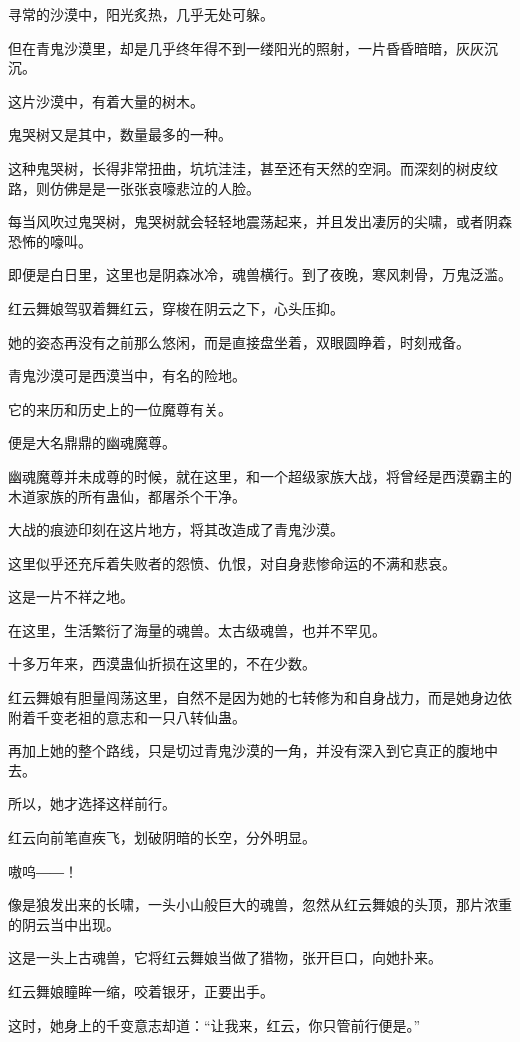 \begin{this_body}
寻常的沙漠中，阳光炙热，几乎无处可躲。

但在青鬼沙漠里，却是几乎终年得不到一缕阳光的照射，一片昏昏暗暗，灰灰沉沉。

这片沙漠中，有着大量的树木。

鬼哭树又是其中，数量最多的一种。

这种鬼哭树，长得非常扭曲，坑坑洼洼，甚至还有天然的空洞。而深刻的树皮纹路，则仿佛是是一张张哀嚎悲泣的人脸。

每当风吹过鬼哭树，鬼哭树就会轻轻地震荡起来，并且发出凄厉的尖啸，或者阴森恐怖的嚎叫。

即便是白日里，这里也是阴森冰冷，魂兽横行。到了夜晚，寒风刺骨，万鬼泛滥。

红云舞娘驾驭着舞红云，穿梭在阴云之下，心头压抑。

她的姿态再没有之前那么悠闲，而是直接盘坐着，双眼圆睁着，时刻戒备。

青鬼沙漠可是西漠当中，有名的险地。

它的来历和历史上的一位魔尊有关。

便是大名鼎鼎的幽魂魔尊。

幽魂魔尊并未成尊的时候，就在这里，和一个超级家族大战，将曾经是西漠霸主的木道家族的所有蛊仙，都屠杀个干净。

大战的痕迹印刻在这片地方，将其改造成了青鬼沙漠。

这里似乎还充斥着失败者的怨愤、仇恨，对自身悲惨命运的不满和悲哀。

这是一片不祥之地。

在这里，生活繁衍了海量的魂兽。太古级魂兽，也并不罕见。

十多万年来，西漠蛊仙折损在这里的，不在少数。

红云舞娘有胆量闯荡这里，自然不是因为她的七转修为和自身战力，而是她身边依附着千变老祖的意志和一只八转仙蛊。

再加上她的整个路线，只是切过青鬼沙漠的一角，并没有深入到它真正的腹地中去。

所以，她才选择这样前行。

红云向前笔直疾飞，划破阴暗的长空，分外明显。

嗷呜――！

像是狼发出来的长啸，一头小山般巨大的魂兽，忽然从红云舞娘的头顶，那片浓重的阴云当中出现。

这是一头上古魂兽，它将红云舞娘当做了猎物，张开巨口，向她扑来。

红云舞娘瞳眸一缩，咬着银牙，正要出手。

这时，她身上的千变意志却道：“让我来，红云，你只管前行便是。”


\end{this_body}
